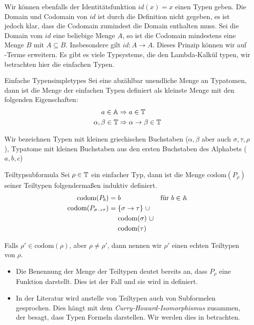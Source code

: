 Wir können ebenfalls der Identitätsfunktion $id(x) = x$ einen Typen geben. Die Domain und Codomain von $id$ ist durch die Definition nicht gegeben, es ist jedoch klar, dass die Codomain zumindest die Domain enthalten muss. Sei die Domain vom $id$ eine beliebige Menge $A$, so ist die Codomain mindestens eine Menge $B$ mit $A\subseteq B$. Insbesondere gilt $id : A \to A$. Dieses Prinzip können wir auf \tlambda-Terme erweitern. Es gibt es viele Typsysteme, die den Lambda-Kalkül typen, wir betrachten hier die einfachen Typen.
\begin{definition}{Einfache Typen}{simpletypes}
    Sei \At{} eine abzählbar unendliche Menge an Typatomen, dann ist die Menge \T{} der einfachen Typen definiert als kleinste Menge mit den folgenden Eigenschaften:
    \begin{align*}
    a\in\mathbb{A}&\Rightarrow a\in\mathbb{T}\\
    \alpha, \beta\in \mathbb{T}&\Rightarrow \alpha\to\beta\in\mathbb{T}
    \end{align*}
 \end{definition}
\begin{convention}
Wir bezeichnen Typen mit kleinen griechischen Buchstaben (\zB $\alpha,\beta$ aber auch $\sigma, \tau, \rho$), Typatome mit kleinen Buchstaben aus den ersten Buchstaben des Alphabets (\zB $a,b,c$)
\end{convention}
\begin{definition}{Teiltyp}{subformula}
    Sei $\rho\in\mathbb{T}$ ein einfacher Typ, dann ist die Menge $\text{codom}(P_\rho)$ seiner Teiltypen folgendermaßen induktiv definiert.
    \begin{align*}
        \text{codom}(P_b) &= b &\text{für }b\in\mathbb{A}\\
        \text{codom}(P_{\sigma\to\tau}) &= 
        \begin{aligned}[t]
         &\{\sigma\to\tau\}~\cup\\
         &\text{codom}(\sigma)~\cup\\
         &\text{codom}(\tau)
        \end{aligned}
    \end{align*}
    
    Falls $\rho'\in\text{codom}(\rho)$, aber $\rho \neq \rho'$, dann nennen wir $\rho'$ einen echten Teiltypen von $\rho$.
\end{definition}
\begin{remark}
    \begin{itemize}
        \item Die Benennung der Menge der Teiltypen deutet bereits an, dass $P_\rho$ eine Funktion darstellt. Dies ist der Fall und sie wird in  definiert.
        \item In der Literatur wird anstelle von Teiltypen auch von Subformelen gesprochen. Dies hängt mit dem \emph{Curry-Howard-Isomorphismus} zusammen, der besagt, dass Typen Formeln darstellen. Wir werden dies in  betrachten.
    \end{itemize}
\end{remark}
